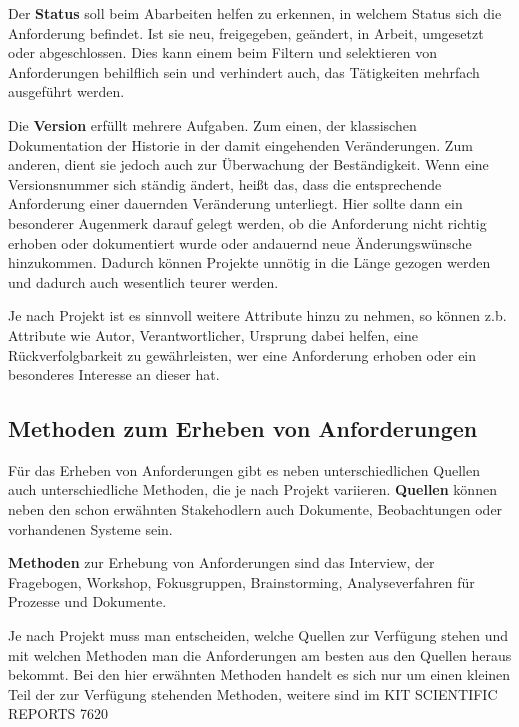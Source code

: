 
Der \textbf{Status} soll beim Abarbeiten helfen zu erkennen, in welchem Status sich die Anforderung befindet. Ist sie neu, freigegeben, geändert, in Arbeit, umgesetzt oder abgeschlossen. Dies kann einem beim Filtern und selektieren von Anforderungen behilflich sein und verhindert auch, das Tätigkeiten mehrfach ausgeführt werden. 


Die \textbf{Version} erfüllt mehrere Aufgaben. Zum einen, der klassischen Dokumentation der Historie in der damit eingehenden Veränderungen. Zum anderen, dient sie jedoch auch zur Überwachung der Beständigkeit. Wenn eine Versionsnummer sich ständig ändert, heißt das, dass die entsprechende Anforderung einer dauernden Veränderung unterliegt.  Hier sollte dann ein besonderer Augenmerk darauf gelegt werden, ob die Anforderung nicht richtig erhoben oder dokumentiert wurde oder andauernd neue Änderungswünsche hinzukommen. Dadurch können Projekte unnötig in die Länge gezogen werden und dadurch auch wesentlich teurer werden.


Je nach Projekt ist es sinnvoll weitere Attribute hinzu zu nehmen, so können z.b. Attribute wie Autor, Verantwortlicher, Ursprung dabei helfen, eine Rückverfolgbarkeit zu gewährleisten, wer eine Anforderung erhoben oder ein besonderes Interesse an dieser hat.

\subsection{Methoden zum Erheben von Anforderungen}

Für das Erheben von Anforderungen gibt es neben unterschiedlichen Quellen auch unterschiedliche Methoden, die je nach Projekt variieren. 
\textbf{Quellen} können neben den schon erwähnten Stakehodlern auch Dokumente, Beobachtungen oder vorhandenen Systeme sein. 

\textbf{Methoden} zur Erhebung von Anforderungen sind das Interview, der Fragebogen, Workshop, Fokusgruppen, Brainstorming, Analyseverfahren für Prozesse und Dokumente.

Je nach Projekt muss man entscheiden, welche Quellen zur Verfügung stehen und mit welchen Methoden man die Anforderungen am besten aus den Quellen heraus bekommt. Bei den hier erwähnten Methoden handelt es sich nur um einen kleinen Teil der zur Verfügung stehenden Methoden, weitere sind im KIT SCIENTIFIC REPORTS 7620 \autocite[16-25]{KPAvMdAM}

